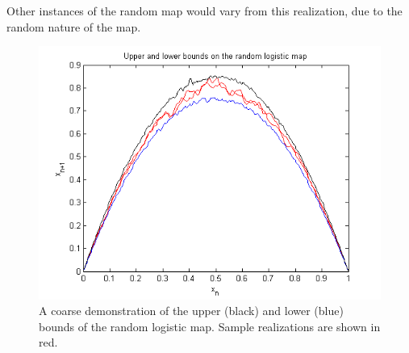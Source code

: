 \documentclass[12pt]{article}
\begin{document}
Other instances of the random map would vary from this realization,
due to the random nature of the map. 
\begin{figure}[H]
	\begin{center}
		\includegraphics[scale=0.7]{envelope}
\caption{A coarse demonstration of the upper (black) and lower (blue) bounds of the
  random logistic map. Sample realizations are shown in red.}
	\end{center}
\end{figure}
\end{document}
